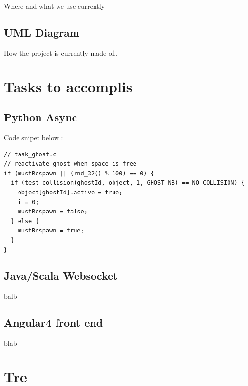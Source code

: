 \documentclass{article}
\begin{document}
{Where and what we use currently}

\subsection{UML Diagram}

{How the project is currently made of..}




{\vspace*{1cm}} \section{Tasks to accomplis}

\subsection{Python Async}

%
Code snipet below : 
\\
{
\begin{lstlisting}
// task_ghost.c
// reactivate ghost when space is free
if (mustRespawn || (rnd_32() % 100) == 0) {
  if (test_collision(ghostId, object, 1, GHOST_NB) == NO_COLLISION) {
    object[ghostId].active = true;
    i = 0;
    mustRespawn = false;
  } else {
	mustRespawn = true;
  }
}

\end{lstlisting}
}

\subsection{Java/Scala Websocket}

{balb}



\subsection{Angular4 front end}

{blab}

  
{\vspace*{1cm}} \section{Tre}
\end{document}
